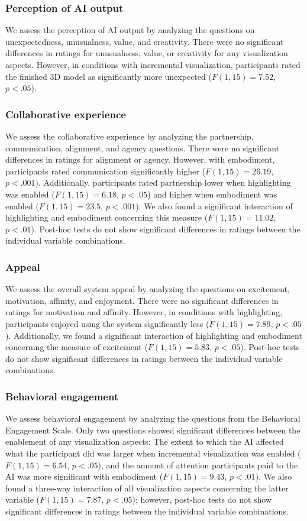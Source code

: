\subsubsection{Perception of AI output}
We assess the perception of AI output by analyzing the questions on unexpectedness, unusualness, value, and creativity.
There were no significant differences in ratings for unusualness, value, or creativity for any visualization aspects. However, in conditions with incremental visualization, participants rated the finished 3D model as significantly more unexpected ($F(1, 15)=7.52$, $p<.05$).

\subsubsection{Collaborative experience}
We assess the collaborative experience by analyzing the partnership, communication, alignment, and agency questions.
There were no significant differences in ratings for alignment or agency. However, with embodiment, participants rated communication significantly higher ($F(1, 15)=26.19$, $p<.001$). Additionally, participants rated partnership lower when highlighting was enabled ($F(1, 15)=6.18$, $p<.05$) and higher when embodiment was enabled ($F(1, 15)=23.5$, $p<.001$). We also found a significant interaction of highlighting and embodiment concerning this measure ($F(1, 15)=11.02$, $p<.01$). Post-hoc tests do not show significant differences in ratings between the individual variable combinations.

\subsubsection{Appeal}
We assess the overall system appeal by analyzing the questions on excitement, motivation, affinity, and enjoyment.
There were no significant differences in ratings for motivation and affinity. However, in conditions with highlighting, participants enjoyed using the system significantly less ($F(1, 15)=7.89$, $p<.05$). Additionally, we found a significant interaction of highlighting and embodiment concerning the measure of excitement ($F(1, 15)=5.83$, $p<.05$). Post-hoc tests do not show significant differences in ratings between the individual variable combinations.

\subsubsection{Behavioral engagement}
We assess behavioral engagement by analyzing the questions from the Behavioral Engagement Scale.
Only two questions showed significant differences between the enablement of any visualization aspects: The extent to which the AI affected what the participant did was larger when incremental visualization was enabled ($F(1, 15)=6.54$, $p<.05$), and the amount of attention participants paid to the AI was more significant with embodiment ($F(1, 15)=9.43$, $p<.01$). We also found a three-way interaction of all visualization aspects concerning the latter variable ($F(1, 15)=7.87$, $p<.05$); however, post-hoc tests do not show significant differences in ratings between the individual variable combinations.

